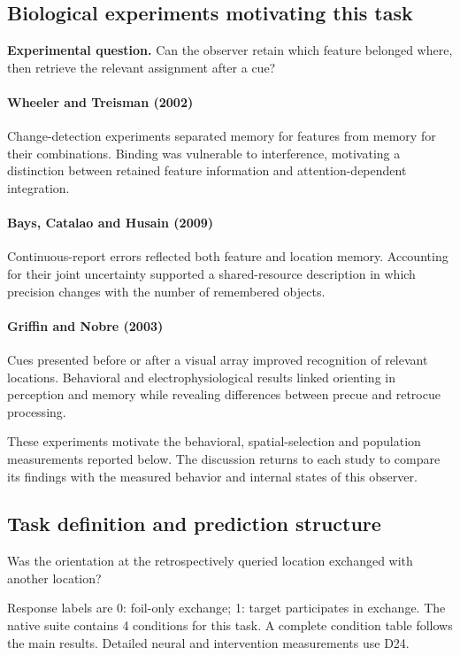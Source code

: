 \documentclass[11pt]{article}
\begin{document}
\subsection{Biological experiments motivating this task}
\textbf{Experimental question.} Can the observer retain which feature belonged where, then retrieve the relevant assignment after a cue?

\paragraph{Wheeler and Treisman (2002)} Change-detection experiments separated memory for features from memory for their combinations. Binding was vulnerable to interference, motivating a distinction between retained feature information and attention-dependent integration. \cite{bio_wheeler}

\paragraph{Bays, Catalao and Husain (2009)} Continuous-report errors reflected both feature and location memory. Accounting for their joint uncertainty supported a shared-resource description in which precision changes with the number of remembered objects. \cite{bio_bays}

\paragraph{Griffin and Nobre (2003)} Cues presented before or after a visual array improved recognition of relevant locations. Behavioral and electrophysiological results linked orienting in perception and memory while revealing differences between precue and retrocue processing. \cite{bio_griffin}

These experiments motivate the behavioral, spatial-selection and population measurements reported below. The discussion returns to each study to compare its findings with the measured behavior and internal states of this observer.
\subsection{Task definition and prediction structure}
Was the orientation at the retrospectively queried location exchanged with another location?

Response labels are 0: foil-only exchange; 1: target participates in exchange. The native suite contains 4 conditions for this task. A complete condition table follows the main results. Detailed neural and intervention measurements use D24.
\end{document}
